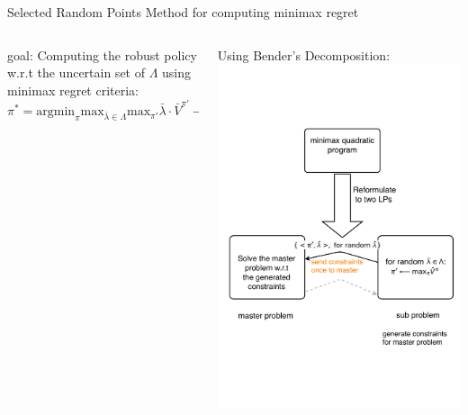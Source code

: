 \documentclass{beamer}
\begin{document}
\begin{frame}{Selected Random Points Method for computing minimax regret}
\begin{columns}
\begin{column}{.45\textwidth}
{\color{red}goal}: Computing the robust policy w.r.t the uncertain set of $\Lambda$ using minimax regret criteria:
\begin{equation*}
\pi^* = \text{argmin}_{\pi} \text{max}_{\bar{\lambda} \in \Lambda} \text{max}_{\pi'} \bar{\lambda} \cdot \bar V^{\pi'} - \bar{\lambda} \cdot \bar V^{\pi}
\end{equation*}
\end{column}
\hfill
\begin{column}{.4\textwidth}
Using \alert{Bender's Decomposition}: ~\\
\includegraphics[width=1.1\textwidth]{figures-new/bender}
\end{column}
\end{columns}
\end{frame}

\end{document}
